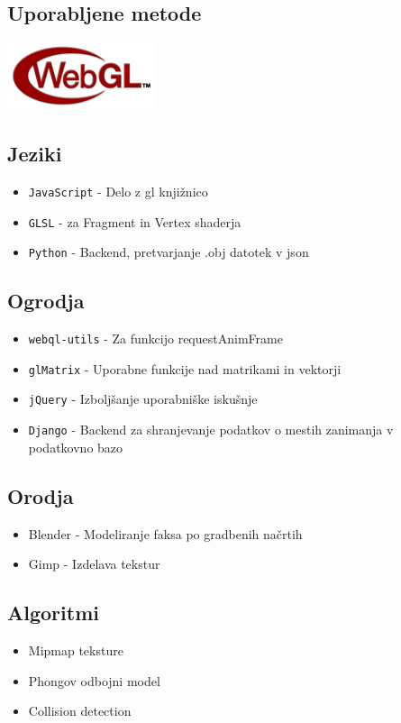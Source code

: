 \documentclass[10pt,a4paper]{article}
\begin{document}
\subsection{Uporabljene metode}
\begin{center}
\includegraphics{./WebGL.png}
\end{center}
\subsection*{Jeziki}
\begin{itemize}
	\item \verb|JavaScript| - Delo z gl knjižnico
	\item \verb|GLSL| - za Fragment in Vertex shaderja
	\item \verb|Python| - Backend, pretvarjanje .obj datotek v json
\end{itemize}
\subsection*{Ogrodja}
\begin{itemize}
	\item \verb|webql-utils| - Za funkcijo requestAnimFrame
	\item \verb|glMatrix| - Uporabne funkcije nad matrikami in vektorji
	\item \verb|jQuery| - Izboljšanje uporabniške iskušnje
	\item \verb|Django| - Backend za shranjevanje podatkov o mestih zanimanja v podatkovno bazo 
\end{itemize}
\subsection*{Orodja}
\begin{itemize}
	\item Blender - Modeliranje faksa po gradbenih načrtih
	\item Gimp - Izdelava tekstur
\end{itemize}
\subsection*{Algoritmi}
\begin{itemize}
	\item Mipmap teksture
	\item Phongov odbojni model
	\item Collision detection
\end{itemize}
\pagebreak
\end{document}
